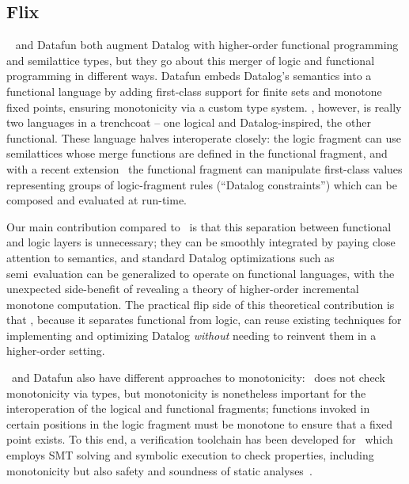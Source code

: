 

\subsection{Flix}
\label{section-flix}

\Flix~\citep{flix} and Datafun both augment Datalog with higher-order functional programming and semilattice types,  but they go about this merger of logic and functional programming in different ways. Datafun embeds Datalog's semantics into a functional language by adding first-class support for finite sets and monotone fixed points, ensuring monotonicity via a custom type system. \Flix, however, is really two languages in a trenchcoat -- one logical and Datalog-inspired, the other functional. These language halves interoperate closely: the logic fragment can use semilattices whose merge functions are defined in the functional fragment, and with a recent extension~\citep{DBLP:journals/pacmpl/MadsenL20} the functional fragment can manipulate first-class values representing groups of logic-fragment rules (``Datalog constraints'') which can be composed and evaluated at run-time.

Our main contribution compared to \flix\ is that this separation between
functional and logic layers is unnecessary; they can be smoothly integrated by
paying close attention to semantics, and standard Datalog optimizations such as
semi\naive\ evaluation can be generalized to operate on functional languages,
with the unexpected side-benefit of revealing a theory of higher-order
incremental monotone computation.
%
The practical flip side of this theoretical contribution is that \flix, because it separates functional from logic, can reuse existing techniques for implementing and optimizing Datalog \emph{without} needing to reinvent them in a higher-order setting.

\Flix\ and Datafun also have different approaches to monotonicity: \flix\ does not check monotonicity via types, but monotonicity is nonetheless important for the interoperation of the logical and functional fragments; functions invoked in certain positions in the logic fragment must be monotone to ensure that a fixed point exists.
%
To this end, a verification toolchain has been developed for \flix\ which employs SMT solving and symbolic execution to check properties, including monotonicity but also safety and soundness of static analyses~\citep{DBLP:conf/issta/MadsenL18}.

